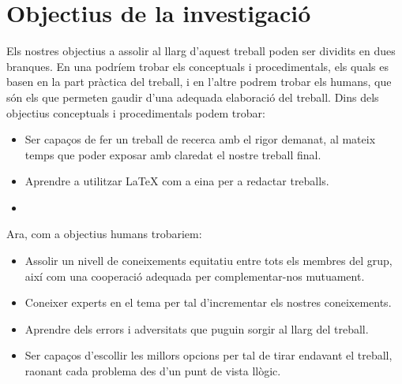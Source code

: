 \documentclass[12pt]{report}
\begin{document}
\section{Objectius de la investigació }
Els nostres objectius a assolir al llarg d'aquest treball poden ser dividits en dues branques. En una podríem trobar els conceptuals i procedimentals, els quals es basen en la part pràctica del treball, i en l'altre podrem trobar els humans, que són els que permeten gaudir d'una adequada elaboració del treball.
\newline
Dins dels objectius conceptuals i procedimentals podem trobar:
\begin{itemize}
\item Ser capaços de fer un treball de recerca amb el rigor demanat, al mateix temps que poder exposar amb claredat el nostre treball final.
\item Aprendre a utilitzar LaTeX com a eina per a redactar treballs.
\item 


\end{itemize}
Ara, com a objectius humans trobariem:
\begin{itemize}
    \item Assolir un nivell de coneixements equitatiu entre tots els membres del grup, així com una cooperació adequada per complementar-nos mutuament.
    \item Coneixer experts en el tema per tal d'incrementar els nostres coneixements.
    \item Aprendre dels errors i adversitats que puguin sorgir al llarg del treball.
    \item Ser capaços d'escollir les millors opcions per tal de tirar endavant el treball, raonant cada problema des d'un punt de vista llògic.
\end{itemize}
\newpage
\end{document}
